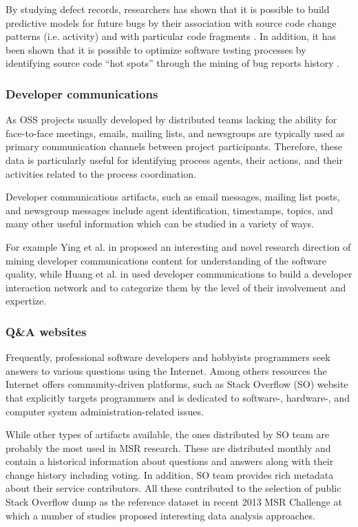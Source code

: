 By studying defect records, researchers has shown that it is possible to build predictive models for future bugs by their association 
with source code change patterns \cite{citeulike:6055293} (i.e. activity) and with particular code fragments \cite{citeulike:393158}. 
In addition, it has been shown that it is possible to optimize software testing processes by identifying source code 
``hot spots'' through the mining of bug reports history \cite{ostrand2004tool}.

\subsubsection{Developer communications}
As OSS projects usually developed by distributed teams lacking the ability for face-to-face meetings, emails, mailing lists, and 
newsgroups are typically used as primary communication channels between project participants. 
Therefore, these data is particularly useful for identifying process agents, their actions, and their activities related to the process 
coordination. 

Developer communications artifacts, such as email messages, mailing list posts, and newsgroup messages include agent identification, 
timestamps, topics, and many other useful information which can be studied in a variety of ways. 

For example Ying et al. in \cite{citeulike:1366052} proposed an interesting and novel research direction of mining developer 
communications content for understanding of the software quality, while Huang et al. in \cite{citeulike:9495129} used developer 
communications to build a developer interaction network and to categorize them by the level of their involvement and expertize.

\subsubsection{Q\&A websites}
Frequently, professional software developers and hobbyists programmers seek answers to various questions using the Internet. 
Among others resources the Internet offers community-driven platforms, such as Stack Overflow (SO) website that explicitly 
targets programmers and is dedicated to software-, hardware-, and computer system administration-related issues.

While other types of artifacts available, the ones distributed by SO team are probably the most used in MSR research. 
These are distributed monthly and contain a historical information about questions and answers along with their change history
including voting. In addition, SO team provides rich metadata about their service contributors. 
All these contributed to the selection of public Stack Overflow dump as the reference dataset in recent 2013 MSR Challenge 
\cite{MSRChallenge2013} at which a number of studies proposed interesting data analysis approaches.


